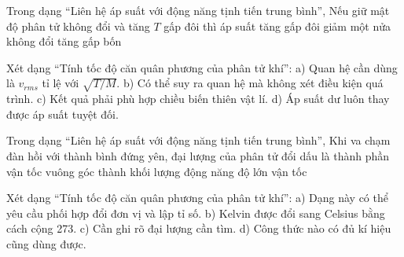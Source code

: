 
\begin{ex}
Trong dạng “Liên hệ áp suất với động năng tịnh tiến trung bình”, Nếu giữ mật độ phân tử không đổi và tăng $T$ gấp đôi thì áp suất
\choice
{\True tăng gấp đôi}
{giảm một nửa}
{không đổi}
{tăng gấp bốn}
\end{ex}

\begin{ex}
Xét dạng “Tính tốc độ căn quân phương của phân tử khí”: a) Quan hệ cần dùng là $v_{rms}$ tỉ lệ với $\sqrt{T/M}$. b) Có thể suy ra quan hệ mà không xét điều kiện quá trình. c) Kết quả phải phù hợp chiều biến thiên vật lí. d) Áp suất dư luôn thay được áp suất tuyệt đối.
\choiceTF

\end{ex}


\begin{ex}
Trong dạng “Liên hệ áp suất với động năng tịnh tiến trung bình”, Khi va chạm đàn hồi với thành bình đứng yên, đại lượng của phân tử đổi dấu là
\choice
{\True thành phần vận tốc vuông góc thành}
{khối lượng}
{động năng}
{độ lớn vận tốc}
\end{ex}

\begin{ex}
Xét dạng “Tính tốc độ căn quân phương của phân tử khí”: a) Dạng này có thể yêu cầu phối hợp đổi đơn vị và lập tỉ số. b) Kelvin được đổi sang Celsius bằng cách cộng 273. c) Cần ghi rõ đại lượng cần tìm. d) Công thức nào có đủ kí hiệu cũng dùng được.
\choiceTF

\end{ex}

